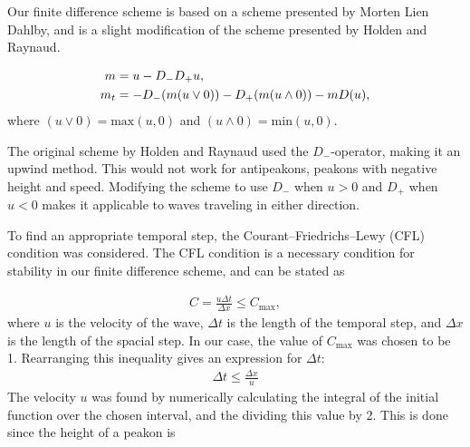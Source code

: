 Our finite difference scheme is based on a scheme presented by Morten Lien Dahlby\cite{dahlby2007geometric}, and is a slight modification of the scheme presented by Holden and Raynaud\cite{holden2006convergence}. 

\begin{align}
m &= u - D_{-}D_{+}u, \notag \\ 
m_t &= -D_{-}(m(u \vee 0)) -D_{+}(m(u \wedge 0)) - mD(u), 
\end{align}
where $(u \vee 0) = \text{max}(u,0)$ and $(u \wedge 0) = \text{min}(u,0)$.

The original scheme by Holden and Raynaud used the $D_{-}$-operator, making it an upwind method. This would not work for antipeakons, peakons with negative height and speed. Modifying the scheme to use  $D_{-}$ when $u > 0$ and $D_{+}$ when $ u < 0$ makes it applicable to waves traveling in either direction. 

To find an appropriate temporal step, the Courant–Friedrichs–Lewy (CFL) condition was considered. The CFL condition is a necessary condition for stability in our finite difference scheme, and can be stated as

\begin{align}
C = \frac{u\Delta t}{\Delta x} \leq C_{\text{max}},
\end{align}
where $u$ is the velocity of the wave, $\Delta t$ is the length of the temporal step, and $\Delta x$ is the length of the spacial step. In our case, the value of $C_{\text{max}}$ was chosen to be 1. Rearranging this inequality gives an expression for $\Delta t$:
\begin{align}
\Delta t \leq \frac{\Delta x}{u}
\end{align}
The velocity $u$ was found by numerically calculating the integral of the initial function over the chosen interval, and the dividing this value by 2. This is done since the height of a peakon is 


